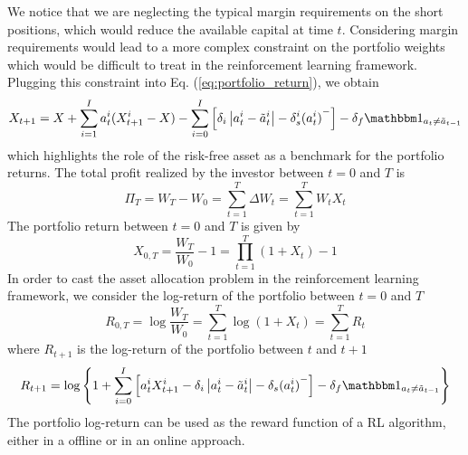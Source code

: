 We notice that we are neglecting the typical margin requirements on the short
positions, which would reduce the available capital at time $t$. Considering
margin requirements would lead to a more complex constraint on the portfolio
weights which would be difficult to treat in the reinforcement learning
framework. Plugging this constraint into Eq. (\ref{eq:portfolio_return}), we
obtain
\begin{equation}\label{eq:portfolio_return_benchmark}
	X_{t+1} = X + \sum^{I}_{i=1} a_t^i (X_{t+1}^i - X) - \sum^{I}_{i=0}
	\left[\delta_i \left| a_t^i - \tilde{a}_t^i \right| - \delta_s^i
	{(a_t^i)}^-\right] - \delta_f \ind{{a}_t \neq \tilde{{a}}_{t-1}}   
\end{equation}
which highlights the role of the risk-free asset as a benchmark for the 
portfolio returns. The total profit realized by the investor between $t=0$ and
$T$ is 
\begin{equation*}
	\Pi_T = W_T - W_0 = \sum^{T}_{t=1} \Delta W_t = \sum^{T}_{t=1} W_t X_t  
\end{equation*}
The portfolio return between $t=0$ and $T$ is given by
\begin{equation*}
	X_{0,T} = \frac{W_T}{W_0} - 1 = \prod_{t=1}^T (1+X_t) - 1
\end{equation*}
In order to cast the asset allocation problem in the reinforcement learning
framework, we consider the log-return of the portfolio between $t=0$ and $T$
\begin{equation}
	R_{0,T} = \log \frac{W_T}{W_0} = \sum^{T}_{t=1} \log(1+X_t) = \sum_{t=1}^T
	R_t
\end{equation}
where $R_{t+1}$ is the log-return of the portfolio between $t$ and $t+1$
\begin{equation}
	R_{t+1} = \log \left\{ 1 + \sum^{I}_{i=0} \left[ a_t^i X_{t+1}^i - \delta_i
	\left| a_t^i - \tilde{a}_t^i \right| - \delta_s {(a_t^i)}^- \right] -
	\delta_f \ind{{a}_t \neq \tilde{{a}}_{t-1}}\right\}
\end{equation}
The portfolio log-return can be used as the reward function of a
RL algorithm, either in a offline or in an online approach.

